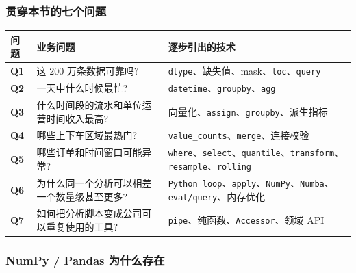 \documentclass[11pt]{article}
\begin{document}
    \subsubsection{贯穿本节的七个问题}\label{ux8d2fux7a7fux672cux8282ux7684ux4e03ux4e2aux95eeux9898}

    {\def\LTcaptype{none} %
\begin{longtable}[]{@{}
  >{\centering\arraybackslash}p{}
  >{\centering\arraybackslash}p{}
  >{\centering\arraybackslash}p{}@{}}
\toprule\noalign{}
\begin{minipage}[b]{\linewidth}\centering
问题
\end{minipage} & \begin{minipage}[b]{\linewidth}\centering
业务问题
\end{minipage} & \begin{minipage}[b]{\linewidth}\centering
逐步引出的技术
\end{minipage} \\
\midrule\noalign{}
\endhead
\bottomrule\noalign{}
\endlastfoot
\textbf{Q1} & 这 200 万条数据可靠吗? &
\texttt{dtype}、缺失值、mask、\texttt{loc}、\texttt{query} \\
\textbf{Q2} & 一天中什么时候最忙? &
\texttt{datetime}、\texttt{groupby}、\texttt{agg} \\
\textbf{Q3} & 什么时间段的流水和单位运营时间收入最高? &
向量化、\texttt{assign}、\texttt{groupby}、派生指标 \\
\textbf{Q4} & 哪些上下车区域最热门? &
\texttt{value\_counts}、\texttt{merge}、连接校验 \\
\textbf{Q5} & 哪些订单和时间窗口可能异常? &
\texttt{where}、\texttt{select}、\texttt{quantile}、\texttt{transform}、\texttt{resample}、\texttt{rolling} \\
\textbf{Q6} & 为什么同一个分析可以相差一个数量级甚至更多? &
\texttt{Python\ loop}、\texttt{apply}、\texttt{NumPy}、\texttt{Numba}、\texttt{eval/query}、内存优化 \\
\textbf{Q7} & 如何把分析脚本变成公司可以重复使用的工具? &
\texttt{pipe}、纯函数、\texttt{Accessor}、领域 API \\
\end{longtable}
}

    \subsubsection{NumPy / Pandas
为什么存在}\label{numpy-pandas-ux4e3aux4ec0ux4e48ux5b58ux5728}
\end{document}

